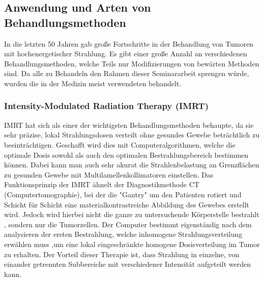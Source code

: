 


\subsection{Anwendung und Arten von Behandlungsmethoden}
In die letzten 50 Jahren gab große Fortschritte in der Behandlung von Tumoren mit hochenergetischer Strahlung.
Es gibt einer große Anzahl an verschiedenen Behandlungsmethoden, welche Teils nur Modifizierungen von bewärten Methoden sind.
Da alle zu Behandeln den Rahmen dieser Seminararbeit sprengen würde, wurden die in der Medizin meist verwendeten behandelt.
\subsubsection{Intensity-Modulated Radiation Therapy (IMRT)}
IMRT hat sich als einer der wichtigsten Behandlungsmethoden behaupte, da sie sehr präzise, lokal Strahlungsdosen verteilt ohne gesundes Gewebe beträchtlich zu beeinträchtigen.
Geschafft wird dies mit Computeralgorithmen, welche die optimale Dosis sowohl als auch den optimalen Bestrahlungsbereich bestimmen können.
Dabei kann man auch sehr akurat die Strahlenbelastung an Grenzflächen zu gesunden Gewebe mit Multilamellenkollimatoren einstellen.
Das Funktionsprinzip der IMRT ähnelt der Diagnostikmethode CT (Computertomographie), bei der die "Gantry" um den Patienten rotiert und Schicht für Schicht eine materialkontrastreiche Abbildung des Gewebes erstellt wird.
Jedoch wird hierbei nicht die ganze zu untersuchende Körperstelle bestrahlt , sondern nur die Tumorzellen.
Der Computer bestimmt eigenständig nach dem analysieren der ersten Bestrahlung, welche inhomogene Strahlungsverteilung erwählen muss ,um eine lokal eingeschränkte homogene Dosisverteilung im Tumor zu erhalten. \cite{teh1999intensity}
Der Vorteil dieser Therapie ist, dass Strahlung in einzelne, von einander getrennten Subbereiche mit verschiedener Intensität aufgeteilt werden kann.
